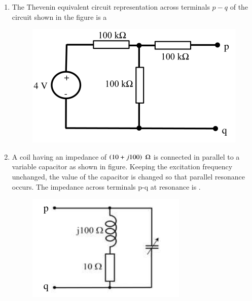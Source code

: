 \documentclass[journal,12pt,onecolumn]{IEEEtran}
\theoremstyle{remark}
\begin{document}
\begin{enumerate}
    \item The Thevenin equivalent circuit representation across terminals $p-q$ of the circuit shown in the figure is a
    \begin{figure}[H]
        \centering
        \includegraphics[width=0.5\columnwidth]{q7.png}
        \caption*{}
        \label{fig:q7}
    \end{figure}
    
    \hfill{}
    \begin{enumerate}
    \end{enumerate}

    \item A coil having an impedance of $\left(10+j100\right)$ $\ohm$ is connected in parallel to a variable capacitor as shown in figure. Keeping the excitation frequency unchanged, the value of the capacitor is changed so that parallel resonance occurs. The impedance across terminals p-q at resonance  is \underline{\hspace{2cm}}.
    \begin{figure}[H]
        \centering
        \includegraphics[width=0.3\columnwidth]{q8.png}
        \caption*{}
        \label{fig:q8}
    \end{figure}
    
    \hfill{}
    

\end{enumerate}
\end{document}
